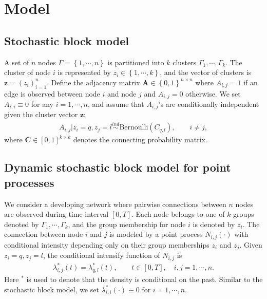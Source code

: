
\section{Model} \label{sec:model}


\subsection{Stochastic block model} 

A set of $n$ nodes $\Gamma=\left\{ 1,\cdots,n \right\}$ is partitioned into $k$ clusters $\Gamma_1,\cdots,\Gamma_k$. 
The cluster of node $i$ is represented by $z_i\in \left\{ 1,\cdots,k \right\}$, and the vector of clusters is $\mathbf{z}=\left( z_i \right)_{i=1}^n $. 
Define the adjacency matrix $\mathbf{A}\in \left\{ 0,1\right\}^{n\times n}$ where  $A_{i,j}= 1$ if an edge is observed between node $i$ and node $j$ and $A_{i,j}=0$ otherwise.
We set ${A}_{i,i}\equiv 0$  for any $i=1,\cdots,n$, 
and assume that $A_{i,j}$'s are conditionally independent given the cluster vector $\mathbf{z}$:
\begin{align*}
{A}_{i,j}|z_i=q,z_j=l \overset{ind}{\sim} \text{Bernoulli}({C}_{q,l}), \qquad i\neq j,
\end{align*}
where $\mathbf{C}\in [0,1]^{k\times k}$ denotes the  connecting probability matrix.




\subsection{Dynamic stochastic block model for point processes}


We consider a developing network where pairwise connections between $n$ nodes are observed during time interval $[0,T]$.
Each node belongs to one of $k$ groups denoted by $\Gamma_1, \cdots, \Gamma_k$, and the group membership for node $i$ is denoted by $z_i$.
The connection between node $i$ and $j$ is modeled by a point process $N_{i,j}(\cdot)$ with conditional intensity depending only on their group memberships $z_i$ and $z_j$. 
Given $z_i=q, z_j=l$, the conditional intensify function of $N_{i,j}$ is
\begin{align*}
\lambda^*_{i,j}(t) = \lambda^*_{q,l}(t), 
\qquad t\in[0,T],\quad i,j=1,\cdots,n.
\end{align*}
Here $^*$ is used to denote that the density is conditional on the past.
Similar to the stochastic block model, we set $\lambda^*_{i,i}(\cdot)\equiv 0$ for $i=1,\cdots,n$.


